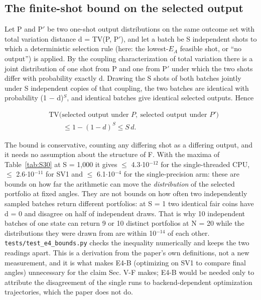 \documentclass[journal]{IEEEtran}
\begin{document}
\subsection{The finite-shot bound on the selected output}


Let P and P$'$ be two one-shot output distributions on the same outcome set with total variation distance d = TV(P, P$'$), and let a batch be S independent shots to which a deterministic selection rule (here: the lowest-$E_{A}$ feasible shot, or ``no output'') is applied. By the coupling characterization of total variation there is a joint distribution of one shot from P and one from P$'$ under which the two shots differ with probability exactly d. Drawing the S shots of both batches jointly under S independent copies of that coupling, the two batches are identical with probability (1 $-$ d)$^{S}$, and identical batches give identical selected outputs. Hence


\begin{equation*}
\begin{aligned} &\mathrm{TV}\bigl(\text{selected output under } P,\ \text{selected output under } P'\bigr)\\ &\qquad \le 1 - (1-d)^S \le S\,d.\end{aligned}
\end{equation*}


The bound is conservative, counting any differing shot as a differing output, and it needs no assumption about the structure of F. With the maxima of Table~\ref{tab:S30} at S = 1,000 it gives $\leq$ 4.3$\cdot$10$^{-12}$ for the single-threaded CPU, $\leq$ 2.6$\cdot$10$^{-11}$ for SV1 and $\leq$ 6.1$\cdot$10$^{-4}$ for the single-precision arm: these are bounds on how far the arithmetic can move the \textit{distribution} of the selected portfolio at fixed angles. They are not bounds on how often two independently sampled batches return different portfolios: at S = 1 two identical fair coins have d = 0 and disagree on half of independent draws. That is why 10 independent batches of one state can return 9 or 10 distinct portfolios at N = 20 while the distributions they were drawn from are within 10$^{-14}$ of each other. \texttt{tests/test\_e4\_bounds.py} checks the inequality numerically and keeps the two readings apart. This is a derivation from the paper's own definitions, not a new measurement, and it is what makes E4-B (optimizing on SV1 to compare final angles) unnecessary for the claim Sec. V-F makes; E4-B would be needed only to attribute the disagreement of the single runs to backend-dependent optimization trajectories, which the paper does not do.
\end{document}
